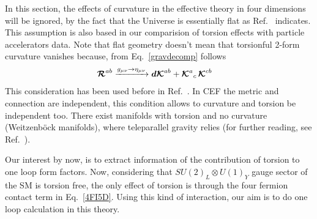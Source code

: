 \documentclass[twocolumn,showpacs,showkeys,prd,superscriptaddress]{revtex4-1}
\begin{document}
In this section, the effects of curvature in the effective theory in four dimensions will be ignored, by the fact that the Universe is essentially flat as Ref.~\cite{Larson:2010gs} indicates. This assumption is also based in our comparision of torsion effects with particle accelerators data. Note that flat geometry doesn't mean that torsionful 2-form curvature vanishes because, from Eq.~\eqref{gravdecomp} follows 
\begin{align}
  {\boldsymbol{\mathcal{R}}}^{a b} &\xrightarrow[]{g_{\mu\nu}\rightarrow\eta_{\mu\nu}} {\boldsymbol{d}}{\boldsymbol{\mathcal{K}}}^{a b} + {\boldsymbol{\mathcal{K}}}^{a}{}_{c}\,{\boldsymbol{\mathcal{K}}}^{c b} 
\end{align}
This consideration has been used before in Ref.~\cite{Carroll:1994dq,Belyaev:1998ax,Kostelecky:2007kx}. In CEF the metric and connection are independent, this condition allows to curvature and torsion be independent too. There exist manifolds with torsion and no curvature (Weitzenb\"ock manifolds), where teleparallel gravity relies (for further reading, see Ref.~\cite{Arcos:2005ec}). 

Our interest by now, is to extract information of the contribution of torsion to one loop form factors. Now, considering that $SU(2)_L\otimes U(1)_Y$ gauge sector of the SM is torsion free, the only effect of torsion is through the four fermion contact term in Eq.~\eqref{4FI5D}. Using this kind of interaction, our aim is to do one loop calculation in this theory. 
\end{document}
